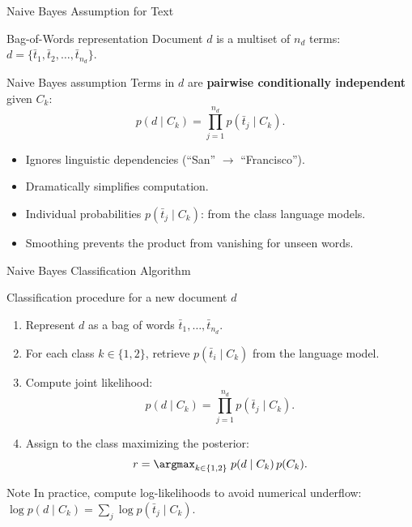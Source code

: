 \begin{frame}{Naive Bayes Assumption for Text}
  \begin{block}{Bag-of-Words representation}
    Document $d$ is a multiset of $n_d$ terms:
    $d=\{\bar t_1,\bar t_2,\ldots,\bar t_{n_d}\}$.
  \end{block}

  \begin{alertblock}{Naive Bayes assumption}
    Terms in $d$ are \textbf{pairwise conditionally independent} given $C_k$:
    \[
      p(d\mid C_k)=\prod_{j=1}^{n_d}p(\bar t_j\mid C_k).
    \]
    \begin{itemize}
      \item Ignores linguistic dependencies (``San'' $\to$ ``Francisco'').
      \item Dramatically simplifies computation.
      \item Individual probabilities $p(\bar t_j\mid C_k)$: from the class language models.
      \item Smoothing prevents the product from vanishing for unseen words.
    \end{itemize}
  \end{alertblock}
\end{frame}

\begin{frame}{Naive Bayes Classification Algorithm}
  \begin{block}{Classification procedure for a new document $d$}
    \begin{enumerate}
      \item Represent $d$ as a bag of words $\bar t_1,\ldots,\bar t_{n_d}$.
      \item For each class $k\in\{1,2\}$, retrieve $p(\bar t_i\mid C_k)$ from the language model.
      \item Compute joint likelihood:
        \[
          p(d\mid C_k)=\prod_{j=1}^{n_d}p(\bar t_j\mid C_k).
        \]
      \item Assign to the class maximizing the posterior:
        \[
          r=\argmax_{k\in\{1,2\}}\; p(d\mid C_k)\,p(C_k).
        \]
    \end{enumerate}
  \end{block}

  \begin{exampleblock}{Note}
    In practice, compute log-likelihoods to avoid numerical underflow:
    $\log p(d\mid C_k)=\sum_j\log p(\bar t_j\mid C_k)$.
  \end{exampleblock}
\end{frame}

